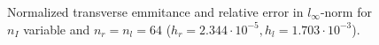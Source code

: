\begin{center}
\begin{figure}[H]
   \begin{subfigure}{0.4\textwidth}
      
   \end{subfigure}
   \qquad \qquad \qquad
   \begin{subfigure}{0.4\textwidth}
      
   \end{subfigure}
   \caption{Normalized transverse emmitance and relative error in $l_\infty$-norm for $n_I$ variable and $n_r=n_l=64$ ($h_r=2.344 \cdot 10^{-5}, h_l=1.703 \cdot 10^{-3}$).}
   \label{fig:sc_cvg_I}
\end{figure}
\end{center}

%       
%       

\newpage

